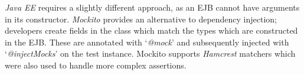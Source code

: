 \par
\textit{Java EE} requires a slightly different approach, as an EJB cannot have arguments in its constructor. \textit{Mockito}\cite{Mockito} provides an alternative to dependency injection; developers create fields in the class which match the types which are constructed in the EJB. These are annotated with `\textit{@mock}' and subsequently injected with `\textit{@injectMocks}' on the test instance. Mockito supports \textit{Hamcrest}\cite{Hamcrest} matchers which were also used to handle more complex assertions.
